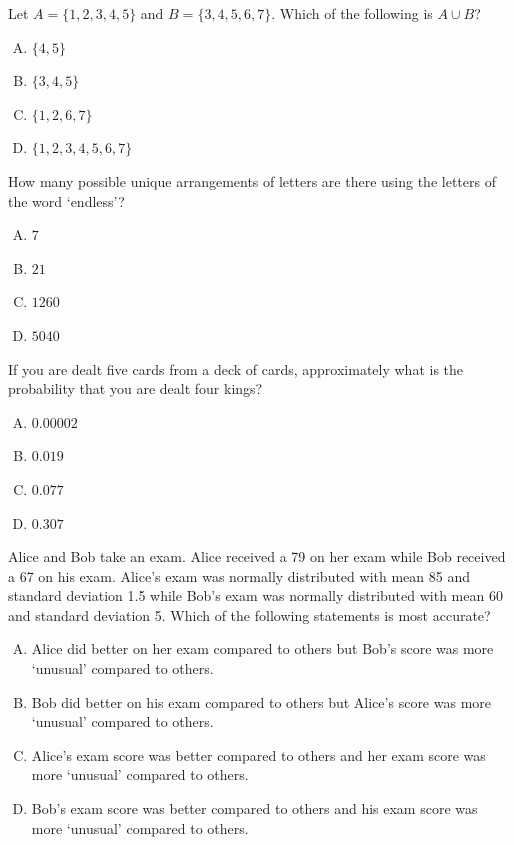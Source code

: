 \documentclass[12pt,letterpaper]{exam}
\begin{document}
\begin{questions}

\question Let $A= \{ 1, 2, 3, 4, 5 \}$ and $B= \{ 3, 4, 5, 6, 7 \}$. Which of the following is $A \cup B$?
	\begin{enumerate}[A.]
	\item $\{ 4, 5 \}$
	\item $\{ 3, 4, 5 \}$
	\item $\{ 1, 2, 6, 7 \}$
	\item $\{ 1, 2, 3, 4, 5, 6, 7 \}$
	\end{enumerate}

\vfill 

\question How many possible unique arrangements of letters are there using the letters of the word `endless'?
	\begin{enumerate}[A.]
	\item $7$
	\item $21$
	\item $1260$
	\item $5040$
	\end{enumerate}

\vfill

\question If you are dealt five cards from a deck of cards, approximately what is the probability that you are dealt four kings?
	\begin{enumerate}[A.]
	\item $0.00002$
	\item $0.019$
	\item $0.077$
	\item $0.307$
	\end{enumerate}

\vfill

\question Alice and Bob take an exam. Alice received a 79 on her exam while Bob received a 67 on his exam. Alice's exam was normally distributed with mean 85 and standard deviation 1.5 while Bob's exam was normally distributed with mean 60 and standard deviation 5. Which of the following statements is most accurate?
	\begin{enumerate}[A.]
	\item Alice did better on her exam compared to others but Bob's score was more `unusual' compared to others. 
	\item Bob did better on his exam compared to others but Alice's score was more `unusual' compared to others. 
	\item Alice's exam score was better compared to others and her exam score was more `unusual' compared to others. 
	\item Bob's exam score was better compared to others and his exam score was more `unusual' compared to others. 
	\end{enumerate}




\end{questions}
\end{document}
